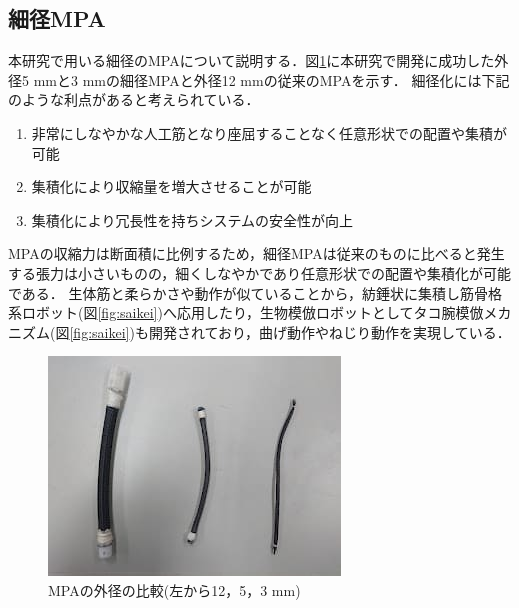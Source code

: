 \subsection{細径MPA}
本研究で用いる細径のMPAについて説明する．図\ref{fig:campare}に本研究で開発に成功した外径5 mmと3 mmの細径MPAと外径12 mmの従来のMPAを示す．
細径化には下記のような利点があると考えられている\cite{wakimoto}\cite{1390282680917523328}．
\begin{enumerate}
  \item 非常にしなやかな人工筋となり座屈することなく任意形状での配置や集積が可能
  \item 集積化により収縮量を増大させることが可能
  \item 集積化により冗長性を持ちシステムの安全性が向上
\end{enumerate}
MPAの収縮力は断面積に比例するため，細径MPAは従来のものに比べると発生する張力は小さいものの，細くしなやかであり任意形状での配置や集積化が可能である．
生体筋と柔らかさや動作が似ていることから，紡錘状に集積し筋骨格系ロボット(図\ref{fig:saikei})へ応用したり，生物模倣ロボットとしてタコ腕模倣メカニズム(図\ref{fig:saikei})も開発されており，曲げ動作やねじり動作を実現している\cite{森和也2014}．
\begin{figure}[t]
  \centering
  \includegraphics[scale=0.7]{image/hikaku.jpg}
  \caption{MPAの外径の比較(左から12，5，3 mm)}
  \label{fig:campare}
\end{figure}
%
